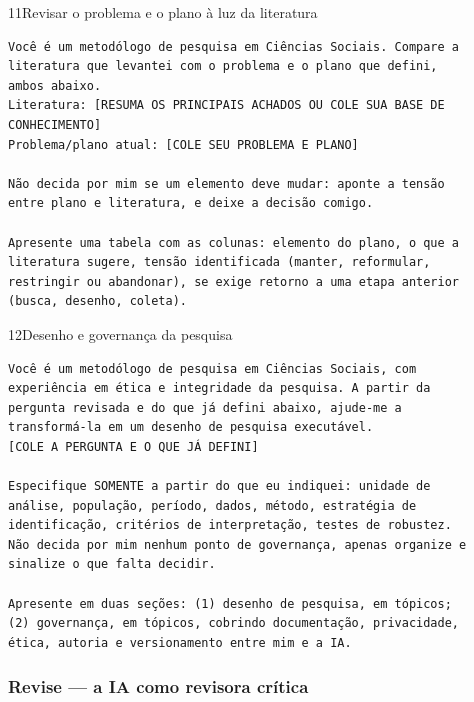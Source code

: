 \documentclass[11pt,a4paper]{article}
\begin{document}
\begin{modelo}{11}{Revisar o problema e o plano à luz da literatura}
\begin{lstlisting}
Você é um metodólogo de pesquisa em Ciências Sociais. Compare a
literatura que levantei com o problema e o plano que defini,
ambos abaixo.
Literatura: [RESUMA OS PRINCIPAIS ACHADOS OU COLE SUA BASE DE
CONHECIMENTO]
Problema/plano atual: [COLE SEU PROBLEMA E PLANO]

Não decida por mim se um elemento deve mudar: aponte a tensão
entre plano e literatura, e deixe a decisão comigo.

Apresente uma tabela com as colunas: elemento do plano, o que a
literatura sugere, tensão identificada (manter, reformular,
restringir ou abandonar), se exige retorno a uma etapa anterior
(busca, desenho, coleta).
\end{lstlisting}
\end{modelo}

\begin{modelo}{12}{Desenho e governança da pesquisa}
\begin{lstlisting}
Você é um metodólogo de pesquisa em Ciências Sociais, com
experiência em ética e integridade da pesquisa. A partir da
pergunta revisada e do que já defini abaixo, ajude-me a
transformá-la em um desenho de pesquisa executável.
[COLE A PERGUNTA E O QUE JÁ DEFINI]

Especifique SOMENTE a partir do que eu indiquei: unidade de
análise, população, período, dados, método, estratégia de
identificação, critérios de interpretação, testes de robustez.
Não decida por mim nenhum ponto de governança, apenas organize e
sinalize o que falta decidir.

Apresente em duas seções: (1) desenho de pesquisa, em tópicos;
(2) governança, em tópicos, cobrindo documentação, privacidade,
ética, autoria e versionamento entre mim e a IA.
\end{lstlisting}
\end{modelo}

\subsubsection*{Revise --- a IA como revisora crítica}
\end{document}
